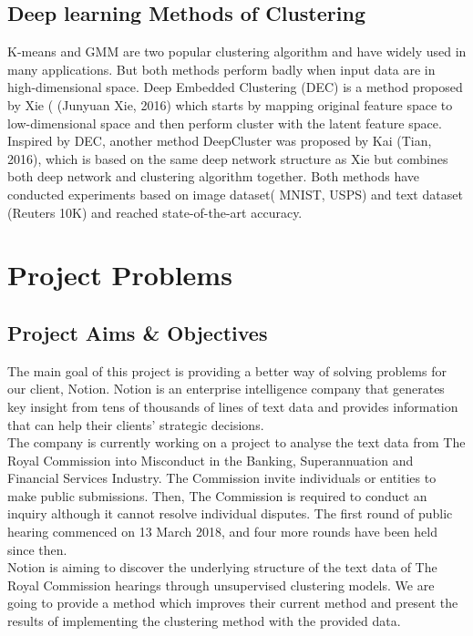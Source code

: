 \documentclass[12pt]{article}
\begin{document}
\subsection{Deep learning Methods of Clustering}
K-means and GMM are two popular clustering algorithm and have widely used in many applications. But both methods perform badly when input data are in high-dimensional space. Deep Embedded Clustering (DEC) is a method proposed by Xie ( (Junyuan Xie, 2016) which starts by mapping original feature space to low-dimensional space and then perform cluster with the latent feature space. Inspired by DEC, another method DeepCluster was proposed by Kai (Tian, 2016), which is based on the same deep network structure as Xie but combines both deep network and clustering algorithm together. Both methods have conducted experiments based on image dataset( MNIST, USPS) and text dataset (Reuters 10K) and reached state-of-the-art accuracy.




\section{Project Problems}\label{sec:pp}
\subsection{Project Aims \& Objectives}
The main goal of this project is providing a better way of solving problems for our client, Notion. Notion is an enterprise intelligence company that generates key insight from tens of thousands of lines of text data and provides information that can help their clients’ strategic decisions. \\

The company is currently working on a project to analyse the text data from The Royal Commission into Misconduct in the Banking, Superannuation and Financial Services Industry. The Commission invite individuals or entities to make public submissions. Then, The Commission is required to conduct an inquiry although it cannot resolve individual disputes. The first round of public hearing  commenced on 13 March 2018, and four more rounds have been held since then. \\

Notion is aiming to discover the underlying structure of the text data of The Royal Commission hearings through unsupervised clustering models. We are going to provide a method which improves their current method and present the results of implementing the clustering method with the provided data. \\
\end{document}
